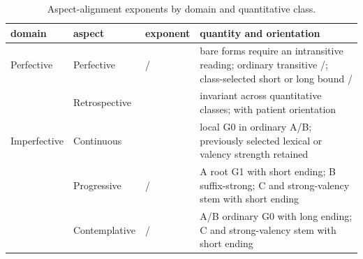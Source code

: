\begin{table}[ht]
	\footnotesize
	\caption{Aspect-alignment exponents by domain and quantitative class.}\ifparadigmappendix\else\label{tab:aspect}\fi
	\begin{tabularx}{0.98\textwidth}{L L L L}
		\toprule
		{\sc domain} & {\sc aspect} & {\sc exponent} & {\sc quantity and orientation} \\
		\midrule
		Perfective & Perfective & / & bare forms require an intransitive reading; ordinary transitive /; class-selected short or long bound / \\
		& Retrospective &  & invariant across quantitative classes;  with patient orientation \\
		\midrule
		Imperfective & Continuous &  & local G0 in ordinary A/B; previously selected lexical or valency strength retained \\
		& Progressive & / & A root G1 with short ending; B suffix-strong; C and strong-valency stem with short ending \\
		& Contemplative & / & A/B ordinary G0 with long ending; C and strong-valency stem with short ending \\
		\bottomrule
	\end{tabularx}
\end{table}
